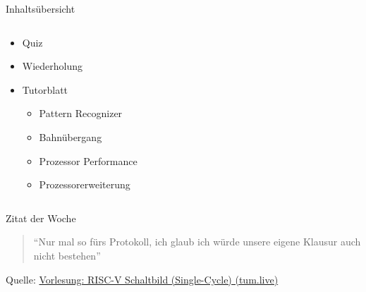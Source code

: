 \documentclass[
  german,            %
  aspectratio=169,    %
]{tumbeamer}
\begin{document}
\begin{frame}[c]{Inhaltsübersicht}{}
  \begin{columns}[c]
    \begin{column}{1\textwidth}
      \begin{itemize}
        \item Quiz
        \item Wiederholung
        \item Tutorblatt
        \begin{itemize}
          \item Pattern Recognizer
          \item Bahnübergang
          \item Prozessor Performance
          \item Prozessorerweiterung
        \end{itemize}
      \end{itemize}
    \end{column}
  \end{columns}
\end{frame}

\begin{frame}[c, fragile]{}{}
  \begin{center}
    \vspace{0.5cm}
    \begin{block}{Zitat der Woche}
      \vspace{0.5cm}
      \begin{quote}
        \enquote{Nur mal so fürs Protokoll, ich glaub ich würde unsere eigene Klausur auch nicht bestehen}
        \vspace{0.5cm}
      \end{quote}
      \vspace{0.5cm}
    \end{block}
    \vspace{0.5cm}
    Quelle: \href{https://tum.live/w/ws24EidR/50026?t=5585}{Vorlesung: RISC-V Schaltbild (Single-Cycle) (tum.live)}
\end{center}
\end{frame}
\end{document}
